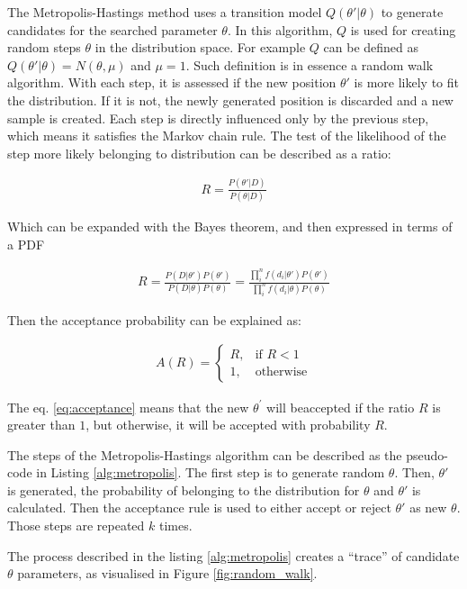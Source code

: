 The Metropolis-Hastings method uses a transition model $Q(\theta'|\theta)$ to generate candidates for the searched parameter $\theta$.
In this algorithm, $Q$ is used for creating random steps $\theta$ in the distribution space.
For example $Q$ can be defined as $Q(\theta'|\theta)=N(\theta, \mu)$ and $\mu=1$. Such definition is in essence a random walk algorithm.
With each step, it is assessed if the new position $\theta'$ is more likely to fit the distribution.
If it is not, the newly generated position is discarded and a new sample is created.
Each step is directly influenced only by the previous step, which means it satisfies the Markov chain rule.
The test of the likelihood of the step more likely belonging to distribution can be described as a ratio:

\begin{align}
  R = \frac{P(\theta'|D)}{P(\theta|D)}
\end{align}

Which can be expanded with the Bayes theorem, and then expressed in terms of a PDF

\begin{align}
  R = \frac{P(D|\theta')P(\theta')}{P(D|\theta)P(\theta)} =\frac{ \prod_{i}^{n}f(d_{i}|\theta')P(\theta') }{\prod_{i}^{n}f(d_{i}|\theta)P(\theta)}
\end{align}

Then the acceptance probability can be explained as:

\begin{align}
    A(R)=
\begin{cases}
    R, & \text{if } R < 1 \\
    1,& \text{otherwise}
\end{cases}
      \label{eq:acceptance}
\end{align}

The eq. \ref{eq:acceptance} means that the new $\theta^{\prime}$ will beaccepted if the ratio $R$ is greater than $1$, but otherwise, it will be accepted with probability $R$.

The steps of the Metropolis-Hastings algorithm can be described as the pseudo-code in Listing \ref{alg:metropolis}.
The first step is to generate random $\theta$. Then, $\theta\prime$ is generated, the probability of belonging to the distribution for $\theta$ and $\theta\prime$ is calculated. Then the acceptance rule is used to either accept or reject $\theta\prime$ as new $\theta$. Those steps are repeated $k$ times.

The process described in the listing \ref{alg:metropolis} creates a ``trace'' of candidate $\theta$ parameters, as visualised in Figure \ref{fig:random_walk}.

